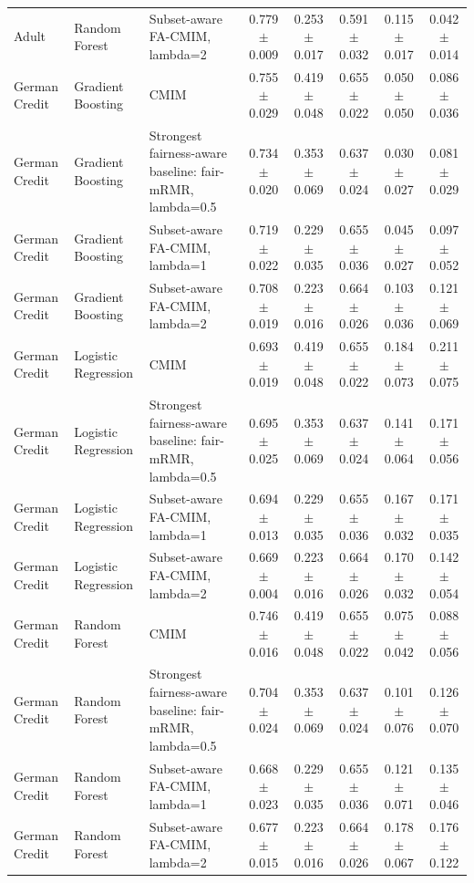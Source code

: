\begin{table}
\begin{tabular}{lllccccc}
Adult & Random Forest & Subset-aware FA-CMIM, lambda=2 & 0.779 $\pm$ 0.009 & 0.253 $\pm$ 0.017 & 0.591 $\pm$ 0.032 & 0.115 $\pm$ 0.017 & 0.042 $\pm$ 0.014 \\
German Credit & Gradient Boosting & CMIM & 0.755 $\pm$ 0.029 & 0.419 $\pm$ 0.048 & 0.655 $\pm$ 0.022 & 0.050 $\pm$ 0.050 & 0.086 $\pm$ 0.036 \\
German Credit & Gradient Boosting & Strongest fairness-aware baseline: fair-mRMR, lambda=0.5 & 0.734 $\pm$ 0.020 & 0.353 $\pm$ 0.069 & 0.637 $\pm$ 0.024 & 0.030 $\pm$ 0.027 & 0.081 $\pm$ 0.029 \\
German Credit & Gradient Boosting & Subset-aware FA-CMIM, lambda=1 & 0.719 $\pm$ 0.022 & 0.229 $\pm$ 0.035 & 0.655 $\pm$ 0.036 & 0.045 $\pm$ 0.027 & 0.097 $\pm$ 0.052 \\
German Credit & Gradient Boosting & Subset-aware FA-CMIM, lambda=2 & 0.708 $\pm$ 0.019 & 0.223 $\pm$ 0.016 & 0.664 $\pm$ 0.026 & 0.103 $\pm$ 0.036 & 0.121 $\pm$ 0.069 \\
German Credit & Logistic Regression & CMIM & 0.693 $\pm$ 0.019 & 0.419 $\pm$ 0.048 & 0.655 $\pm$ 0.022 & 0.184 $\pm$ 0.073 & 0.211 $\pm$ 0.075 \\
German Credit & Logistic Regression & Strongest fairness-aware baseline: fair-mRMR, lambda=0.5 & 0.695 $\pm$ 0.025 & 0.353 $\pm$ 0.069 & 0.637 $\pm$ 0.024 & 0.141 $\pm$ 0.064 & 0.171 $\pm$ 0.056 \\
German Credit & Logistic Regression & Subset-aware FA-CMIM, lambda=1 & 0.694 $\pm$ 0.013 & 0.229 $\pm$ 0.035 & 0.655 $\pm$ 0.036 & 0.167 $\pm$ 0.032 & 0.171 $\pm$ 0.035 \\
German Credit & Logistic Regression & Subset-aware FA-CMIM, lambda=2 & 0.669 $\pm$ 0.004 & 0.223 $\pm$ 0.016 & 0.664 $\pm$ 0.026 & 0.170 $\pm$ 0.032 & 0.142 $\pm$ 0.054 \\
German Credit & Random Forest & CMIM & 0.746 $\pm$ 0.016 & 0.419 $\pm$ 0.048 & 0.655 $\pm$ 0.022 & 0.075 $\pm$ 0.042 & 0.088 $\pm$ 0.056 \\
German Credit & Random Forest & Strongest fairness-aware baseline: fair-mRMR, lambda=0.5 & 0.704 $\pm$ 0.024 & 0.353 $\pm$ 0.069 & 0.637 $\pm$ 0.024 & 0.101 $\pm$ 0.076 & 0.126 $\pm$ 0.070 \\
German Credit & Random Forest & Subset-aware FA-CMIM, lambda=1 & 0.668 $\pm$ 0.023 & 0.229 $\pm$ 0.035 & 0.655 $\pm$ 0.036 & 0.121 $\pm$ 0.071 & 0.135 $\pm$ 0.046 \\
German Credit & Random Forest & Subset-aware FA-CMIM, lambda=2 & 0.677 $\pm$ 0.015 & 0.223 $\pm$ 0.016 & 0.664 $\pm$ 0.026 & 0.178 $\pm$ 0.067 & 0.176 $\pm$ 0.122 \\
\bottomrule
\end{tabular}
\end{table}
